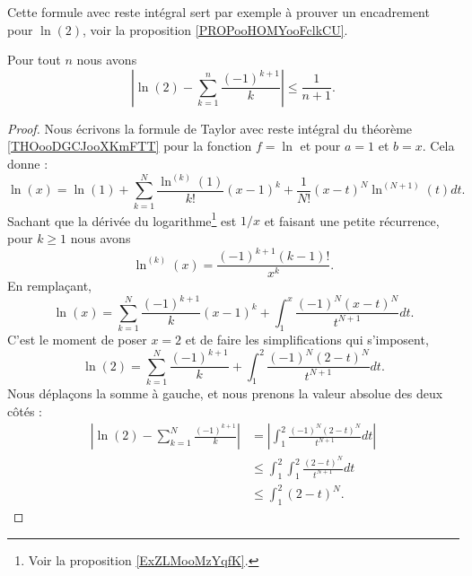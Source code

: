 Cette formule avec reste intégral sert par exemple à prouver un encadrement pour \( \ln(2)\), voir la proposition \ref{PROPooHOMYooFclkCU}.

\begin{proposition}       \label{PROPooHOMYooFclkCU}
	Pour tout \( n\) nous avons
	\begin{equation}
		\left| \ln(2)-\sum_{k=1}^n\frac{ (-1)^{k+1} }{ k } \right|\leq \frac{1}{ n+1 }.
	\end{equation}
\end{proposition}

\begin{proof}
	Nous écrivons la formule de Taylor avec reste intégral du théorème \ref{THOooDGCJooXKmFTT} pour la fonction \( f=\ln\) et pour \( a=1\) et \( b=x\). Cela donne :
	\begin{equation}
		\ln(x)=\ln(1)+\sum_{k=1}^N\frac{ \ln^{(k)}(1) }{ k! }(x-1)^k+\frac{1}{ N! }(x-t)^N\ln^{(N+1)}(t)dt.
	\end{equation}
	Sachant que la dérivée du logarithme\footnote{Voir la proposition \ref{ExZLMooMzYqfK}.} est \( 1/x\) et faisant une petite récurrence, pour \( k\geq 1\) nous avons
	\begin{equation}
		\ln^{(k)}(x)=\frac{ (-1)^{k+1}(k-1)! }{ x^k }.
	\end{equation}
	En remplaçant,
	\begin{equation}
		\ln(x)=\sum_{k=1}^N\frac{ (-1)^{k+1} }{ k }(x-1)^k+\int_1^x\frac{ (-1)^N(x-t)^N }{ t^{N+1} }dt.
	\end{equation}
	C'est le moment de poser \( x=2\) et de faire les simplifications qui s'imposent,
	\begin{equation}
		\ln(2)=\sum_{k=1}^N\frac{ (-1)^{k+1} }{ k }+\int_1^2\frac{ (-1)^N(2-t)^N }{ t^{N+1} }dt.
	\end{equation}
	Nous déplaçons la somme à gauche, et nous prenons la valeur absolue des deux côtés :
	\begin{subequations}
		\begin{align}
			| \ln(2)-\sum_{k=1}^N\frac{ (-1)^{k+1} }{ k } | & =| \int_1^2\frac{ (-1)^N(2-t)^N }{ t^{N+1} }dt |                              \\
			                                                & \leq\int_1^2\int_1^2\frac{ (2-t)^N }{ t^{N+1} }dt \label{SUBEQooZSXEooVcbJpd} \\
			                                                & \leq \int_1^2(2-t)^N       \label{SUBEQooHGZLooGIhoVt}.
		\end{align}

\end{subequations}
\end{proof}
